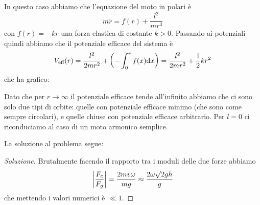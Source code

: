 \documentclass[11pt]{scrartcl}
\newcommand{\dif}{\text{d}}
\begin{document}
	\begin{sol}
		In questo caso abbiamo che l'equazione del moto in polari è
		$$m\ddot{r}=f(r)+\frac{l^2}{mr^3}$$
		con $f(r)=-kr$ una forza elastica di costante $k>0$. Passando ai potenziali quindi abbiamo che il potenziale efficace del sistema è
		$$V_\text{eff}(r)=\frac{l^2}{2mr^2}+\left(-\int_0^r f(x)\dif x\right)=\frac{l^2}{2mr^2}+\half kr^2$$
		che ha grafico:
		\begin{center}
		\end{center}
		Dato che per $r\to\infty$ il potenziale efficace tende all'infinito abbiamo che ci sono solo due tipi di orbite: quelle con potenziale efficace minimo (che sono come sempre circolari), e quelle chiuse con potenziale efficace arbitrario. Per $l=0$ ci riconduciamo al caso di un moto armonico semplice.
	\end{sol}
	\begin{sol}
		La soluzione al problema segue:
		\begin{proof}[Soluzione]
			Brutalmente facendo il rapporto tra i moduli delle due forze abbiamo
			$$\left\lvert \frac{F_c}{F_g} \right\rvert=\frac{2mv\omega}{mg}\approx\frac{2\omega\sqrt{2gh}}{g}$$
			che mettendo i valori numerici è $\ll 1$.
		\end{proof}
	\end{sol}
\end{document}
